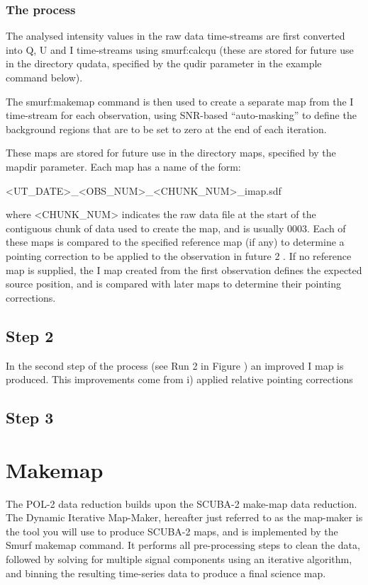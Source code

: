 \subsubsection*{The process}
The  analysed  intensity values in the raw data time-streams are first converted into Q, U and I time-streams
using smurf:calcqu (these are stored for future use in the directory qudata, specified by the qudir parameter in the example command below). 

The smurf:makemap command is then used to create a separate map from the I time-stream for each observation, using SNR-based “auto-masking” to define the background regions that are to be set to zero at the end of each iteration.  

These maps are stored for future use in the directory maps, specified by the mapdir parameter. Each map has a name of the form:

<UT_DATE>_<OBS_NUM>_<CHUNK_NUM>_imap.sdf

where <CHUNK_NUM> indicates the raw data file at the start of the contiguous chunk of data used to create the map, and is
usually 0003. Each of these maps is compared to the specified reference map (if any) to determine a pointing correction to be applied to the observation in future
2 . If no reference map is supplied, the I map created from the first observation defines the expected source position, and is compared with later maps to determine their pointing corrections.


\subsection*{Step 2}

In the second step of the process (see Run 2 in Figure \cite{fig:pol2drflow}) an improved I map is produced. This improvements come from i) applied relative pointing corrections 


\subsection*{Step 3}



\section{Makemap}

The POL-2 data reduction builds upon the SCUBA-2 make-map data reduction. The Dynamic Iterative Map-Maker, hereafter just referred to as the map-maker is the tool you will use to produce SCUBA-2 maps, and is implemented by the Smurf makemap command. It performs all pre-processing steps to clean the data, followed by solving for multiple signal components using an iterative algorithm, and binning the resulting time-series data to produce a final science map. 



